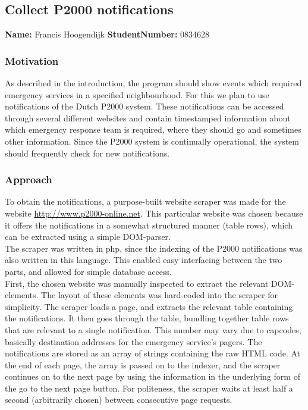 \subsection{Collect P2000 notifications}
\textbf{Name:} Francis Hoogendijk \indent \textbf{StudentNumber:} 0834628

\subsubsection*{Motivation}
As described in the introduction, the program should show events which required emergency services in a specified neighbourhood. For this we plan to use notifications of the Dutch P2000 system. These notifications can be accessed through several different websites and contain timestamped information about which emergency response team is required, where they should go and sometimes other information. Since the P2000 system is continually operational, the system should frequently check for new notifications.

\subsubsection*{Approach}
To obtain the notifications, a purpose-built website scraper was made for the website \url{http://www.p2000-online.net}. This particular website was chosen because it offers the notifications in a somewhat structured manner (table rows), which can be extracted using a simple DOM-parser.\\

The scraper was written in php, since the indexing of the P2000 notifications was also written in this language. This enabled easy interfacing between the two parts, and allowed for simple database access. \\

First, the chosen website was manually inspected to extract the relevant DOM-elements. The layout of these elements was hard-coded into the scraper for simplicity. The scraper loads a page, and extracts the relevant table containing the notifications. It then goes through the table, bundling together table rows that are relevant to a single notification. This number may vary due to capcodes, basically destination addresses for the emergency service's pagers. The notifications are stored as an array of strings containing the raw HTML code. At the end of each page, the array is passed on to the indexer, and the scraper continues on to the next page by using the information in the underlying form of the go to the next page button. For politeness, the scraper waits at least half a second (arbitrarily chosen) between consecutive page requests.\\

